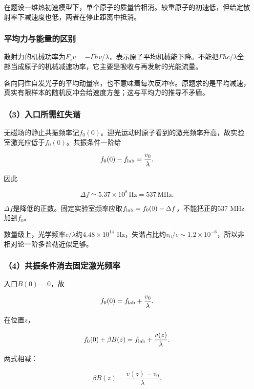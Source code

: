 \documentclass[12pt,a4paper,fontset=fandol]{ctexart}
\begin{document}
在题设一维热初速模型下，单个原子的质量恰相消。较重原子的初速低，但给定散射率下减速度也低，两者在停止距离中抵消。

\subsubsection{平均力与能量的区别}\label{ux5e73ux5747ux529bux4e0eux80fdux91cfux7684ux533aux522b}

散射力的机械功率为\(F_zv=-\Gamma h v/\lambda\)，表示原子平均机械能下降。不能把\(\Gamma hc/\lambda\)全部当成原子的机械减速功率，它主要是吸收与再发射的光能流量。

各向同性自发光子的平均动量零，也不意味着每次反冲零。原题求的是平均减速，真实有限样本的随机反冲会给速度方差；这与平均力的推导不矛盾。

\subsubsection{（3）入口所需红失谐}\label{ux5165ux53e3ux6240ux9700ux7ea2ux5931ux8c10}

无磁场的静止共振频率记\(f_0(0)\)。迎光运动时原子看到的激光频率升高，故实验室激光应低于\(f_0(0)\)。共振条件一阶给

\[
f_0(0)-f_{\rm lab}=\frac{v_0}{\lambda}.
\]

因此

\[
\boxed{\Delta f\simeq5.37\times10^8\,\mathrm{Hz}
=537\,\mathrm{MHz}}.
\]

\(\Delta f\)是降低的正数。固定实验室频率应取\(f_{\rm lab}=f_0(0)-\Delta f\)，不能把正的537
MHz加到\(f_0\)。

数量级上，光学频率\(c/\lambda\)约\(4.48\times10^{14}\)
Hz，失谐占比约\(v_0/c\sim1.2\times10^{-6}\)，所以非相对论一阶多普勒近似足够。

\subsubsection{（4）共振条件消去固定激光频率}\label{ux5171ux632fux6761ux4ef6ux6d88ux53bbux56faux5b9aux6fc0ux5149ux9891ux7387}

入口\(B(0)=0\)，故

\[
f_0(0)=f_{\rm lab}+\frac{v_0}{\lambda}.
\]

在位置\(z\)，

\[
f_0(0)+\beta B(z)
=f_{\rm lab}+\frac{v(z)}{\lambda}.
\]

两式相减：

\[
\beta B(z)=\frac{v(z)-v_0}{\lambda}.
\]
\end{document}
